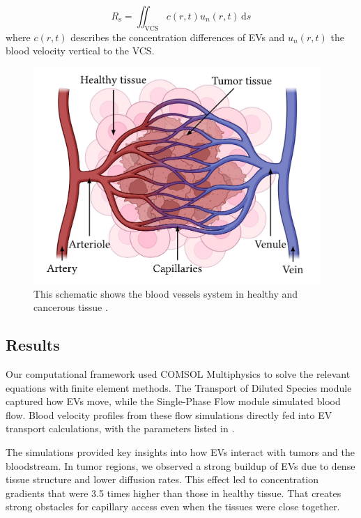 \documentclass[sigconf]{acmart}
\begin{document}
\begin{equation}
  R_{\text{s}}=\iint_{\text{VCS}}c(r,t)u_{n}(r,t)\,\mathrm{d}s
\end{equation}
where $c(r,t)$ describes the concentration differences of EVs and $u_{n}(r,t)$ the blood velocity vertical to the VCS.

\begin{figure}[h]
  \centering
  \includegraphics[width=\linewidth]{pictures/schematic_bloodvessels.png}
  \caption{This schematic shows the blood vessels system in healthy and cancerous tissue \cite{Zoofaghari_2023}.}
  \Description{}
\end{figure}

\newpage

\subsection{Results}
\label{sec: num-results}
Our computational framework used COMSOL Multiphysics to solve the relevant equations with finite element methods. The Transport of Diluted Species module captured how EVs move, while the Single-Phase Flow module simulated blood flow. Blood velocity profiles from these flow simulations directly fed into EV transport calculations, with the parameters listed in \cite{Zoofaghari_2023}.

The simulations provided key insights into how EVs interact with tumors and the bloodstream. In tumor regions, we observed a strong buildup of EVs due to dense tissue structure and lower diffusion rates. This effect led to concentration gradients that were 3.5 times higher than those in healthy tissue. That creates strong obstacles for capillary access even when the tissues were close together.
\end{document}
